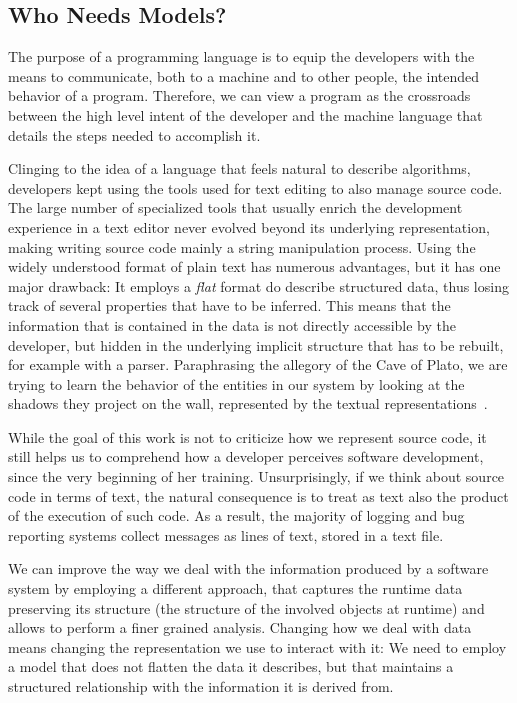 \subsection{Who Needs Models?}

The purpose of a programming language is to equip the developers with the means to communicate, both to a machine and to other people, the intended behavior of a program.
Therefore, we can view a program  as the crossroads between the high level intent of the developer and the machine language that details the steps needed to accomplish it.

Clinging to the idea of a language that feels natural to describe algorithms, developers kept using the tools used for text editing to also manage source code.
The large number of specialized tools that usually enrich the development experience in a text editor never evolved beyond its underlying representation, making writing source code mainly a string manipulation process.
Using the widely understood format of plain text has numerous advantages, but it has one major drawback: It employs a \emph{flat} format do describe structured data, thus losing track of several properties that have to be inferred.
This means that the information that is contained in the data is not directly accessible by the developer, but hidden in the underlying implicit structure that has to be rebuilt, for example with a parser.
Paraphrasing the allegory of the Cave of Plato, we are trying to learn the behavior of the entities in our system by looking at the shadows they project on the wall, represented by the textual representations~\cite{Plato380a}.

While the goal of this work is not to criticize how we represent source code, it still helps us to comprehend how a developer perceives software development, since the very beginning of her training.
Unsurprisingly, if we think about source code in terms of text, the natural consequence is to treat as text also the product of the execution of such code.
As a result, the majority of logging and bug reporting systems collect messages as lines of text, stored in a text file.

We can improve the way we deal with the information produced by a software system by employing a different approach, that captures the runtime data preserving its structure (\eg the structure of the involved objects at runtime) and allows to perform a finer grained analysis.
Changing how we deal with data means changing the representation we use to interact with it: We need to employ a model that does not flatten the data it describes, but that maintains a structured relationship with the information it is derived from.

